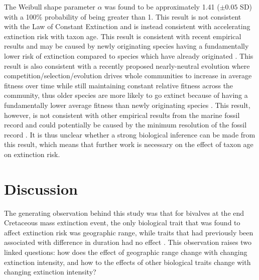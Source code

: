 \documentclass[11pt]{article}
\begin{document}
The Weibull shape parameter \(\alpha\) was found to be approximately 1.41 (\(\pm 0.05\) SD) with a 100\% probability of being greater than 1. This result is not consistent with the Law of Constant Extinction \citep{VanValen1973} and is instead consistent with accelerating extinction risk with taxon age. This result is consistent with recent empirical results and may be caused by newly originating species having a fundamentally lower risk of extinction compared to species which have already originated \citep{Wagner2014b,Quental2013,Smits2015}. This result is also consistent with a recently proposed nearly-neutral evolution where competition/selection/evolution drives whole communities to increase in average fitness over time while still maintaining constant relative fitness across the community, thus older species are more likely to go extinct because of having a fundamentally lower average fitness than newly originating species \citep{Rosindell2015a}. This result, however, is not consistent with other empirical results from the marine fossil record \citep{Finnegan2008,Crampton2016} and could potentially be caused by the minimum resolution of the fossil record \citep{Sepkoski1975}. It is thus unclear whether a strong biological inference can be made from this result, which means that further work is necessary on the effect of taxon age on extinction risk.



\section*{Discussion}



The generating observation behind this study was that for bivalves at the end Cretaceous mass extinction event, the only biological trait that was found to affect extinction risk was geographic range, while traits that had previously been associated with difference in duration had no effect \citep{Jablonski1986}. This observation raises two linked questions: how does the effect of geographic range change with changing extinction intensity, and how to the effects of other biological traits change with changing extinction intensity?
\end{document}
